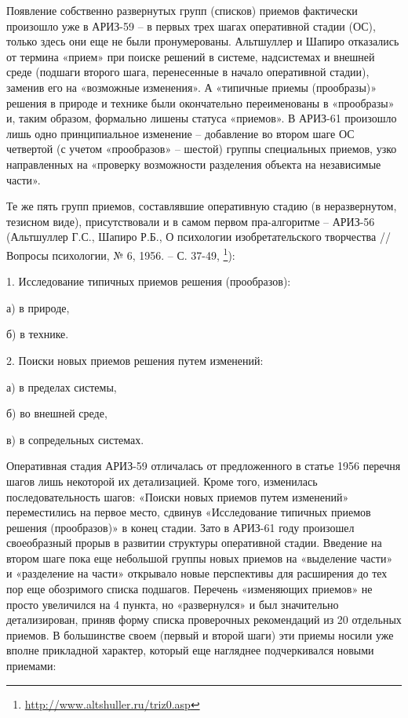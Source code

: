 \documentclass[11pt,a4paper]{article}
\begin{document}
Появление собственно развернутых групп (списков) приемов фактически произошло
уже в АРИЗ-59 -- в первых трех шагах оперативной стадии (ОС), только здесь они
еще не были пронумерованы. Альтшуллер и Шапиро отказались от термина «прием»
при поиске решений в системе, надсистемах и внешней среде (подшаги второго
шага, перенесенные в начало оперативной стадии), заменив его на «возможные
изменения». А «типичные приемы (прообразы)» решения в природе и технике были
окончательно переименованы в «прообразы» и, таким образом, формально лишены
статуса «приемов». В АРИЗ-61 произошло лишь одно принципиальное изменение --
добавление во втором шаге ОС четвертой (с учетом «прообразов» -- шестой)
группы специальных приемов, узко направленных на «проверку возможности
разделения объекта на независимые части».

Те же пять групп приемов, составлявшие оперативную стадию (в неразвернутом,
тезисном виде), присутствовали и в самом первом пра-алгоритме -- АРИЗ-56
(Альтшуллер Г.С., Шапиро Р.Б., О психологии изобретательского творчества
//Вопросы психологии, № 6, 1956. -- С. 37-49,
\footnote{\url{http://www.altshuller.ru/triz0.asp}}):

1. Исследование типичных приемов решения (прообразов):

а) в природе,

б) в технике.

2. Поиски новых приемов решения путем изменений:

а) в пределах системы,

б) во внешней среде,

в) в сопредельных системах.

Оперативная стадия АРИЗ-59 отличалась от предложенного в статье 1956 перечня
шагов лишь некоторой их детализацией. Кроме того, изменилась
последовательность шагов: «Поиски новых приемов путем изменений» переместились
на первое место, сдвинув «Исследование типичных приемов решения (прообразов)»
в конец стадии. Зато в АРИЗ-61 году произошел своеобразный прорыв в развитии
структуры оперативной стадии. Введение на втором шаге пока еще небольшой
группы новых приемов на «выделение части» и «разделение на части» открывало
новые перспективы для расширения до тех пор еще обозримого списка
подшагов. Перечень «изменяющих приемов» не просто увеличился на 4 пункта, но
«развернулся» и был значительно детализирован, приняв форму списка проверочных
рекомендаций из 20 отдельных приемов. В большинстве своем (первый и второй
шаги) эти приемы носили уже вполне прикладной характер, который еще нагляднее
подчеркивался новыми приемами:
\end{document}
